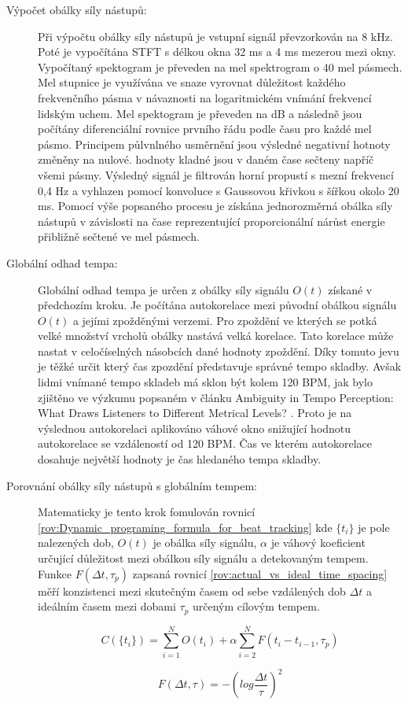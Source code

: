     \begin{description}
      \item[Výpočet obálky síly nástupů:] Při výpočtu obálky síly nástupů je vstupní signál převzorkován na 8 kHz. Poté je vypočítána \acs{STFT} s délkou okna 32 ms a 4 ms mezerou mezi okny. Vypočítaný spektogram je převeden na mel spektrogram o 40 mel pásmech. Mel stupnice je využívána ve snaze vyrovnat důležitost každého frekvenčního pásma v návaznosti na logaritmickém vnímání frekvencí lidským uchem. Mel spektogram je převeden na dB a následně jsou počítány diferenciální rovnice prvního řádu podle času pro každé mel pásmo. Principem půlvnlného usměrnění jsou výsledné negativní hotnoty změněny na nulové. hodnoty kladné jsou v daném čase sečteny napříč všemi pásmy. Výsledný signál je filtrován horní propustí s mezní frekvencí 0,4 Hz a vyhlazen pomocí konvoluce s Gaussovou křivkou s šířkou okolo 20 ms. Pomocí výše popsaného procesu je získána jednorozměrná obálka síly nástupů v závislosti na čase reprezentující proporcionální nárůst energie přibližně sečtené ve mel pásmech.
      \item[Globální odhad tempa:] Globální odhad tempa je určen z obálky síly signálu $O(t)$ získané v předchozím kroku. Je počítána autokorelace mezi původní obálkou signálu $O(t)$ a jejími zpožděnými verzemi. Pro zpoždění ve kterých se potká velké množství vrcholů obálky nastává velká korelace. Tato korelace může nastat v celočíselných násobcích dané hodnoty zpoždění. Díky tomuto jevu je těžké určit který čas zpozdění představuje správné tempo skladby. Avšak lidmi vnímané tempo skladeb má sklon být kolem 120 \acs{BPM}, jak bylo zjištěno ve výzkumu popsaném v článku Ambiguity in Tempo Perception: What Draws Listeners to Different Metrical Levels? \cite{Ambiguity_in_tempo_perception}. Proto je na výslednou autokorelaci aplikováno váhové okno snižující hodnotu autokorelace se vzdáleností od 120 BPM. Čas ve kterém autokorelace dosahuje největší hodnoty je čas hledaného tempa skladby.  
      \item[Porovnání obálky síly nástupů s globálním tempem:] Matematicky je tento krok fomulován rovnicí \ref{rov:Dynamic_programing_formula_for_beat_tracking} kde $ \{t_i\} $ je pole nalezených dob, $O(t)$ je obálka síly signálu, $\alpha$ je váhový koeficient určující důležitost mezi obálkou síly signálu a detekovaným tempem. Funkce $F(\Delta t, \tau_p)$ zapsaná rovnicí \ref{rov:actual_vs_ideal_time_spacing} měří konzistenci mezi skutečným časem od sebe vzdálených dob $\Delta t$ a ideálním časem mezi dobami $ \tau_p$ určeným cílovým tempem.

      \begin{equation}
        C(\{t_i\}) = \sum_{i = 1}^{N} O(t_i) + \alpha \sum_{i = 2}^{N} F(t_i - t_{i-1}, \tau_p)
        \label{rov:Dynamic_programing_formula_for_beat_tracking}
      \end{equation}
  
      \begin{equation}
        F(\Delta t, \tau) = -(log \frac{\Delta t}{\tau})^2
        \label{rov:actual_vs_ideal_time_spacing}
      \end{equation}
    \end{description}
    
